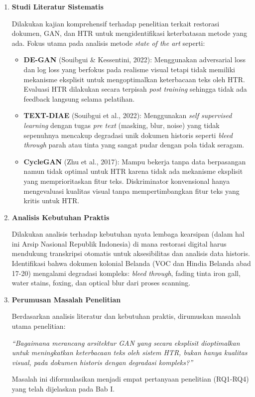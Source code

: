 \documentclass[12pt,a4paper]{article}
\begin{document}
\begin{enumerate}[label=\arabic*., leftmargin=*, nosep]
\item \textbf{Studi Literatur Sistematis}

Dilakukan kajian komprehensif terhadap penelitian terkait restorasi dokumen, GAN, dan HTR untuk mengidentifikasi keterbatasan metode yang ada. Fokus utama pada analisis metode \textit{state of the art} seperti:

\begin{itemize}[leftmargin=*, nosep]
\item \textbf{DE-GAN} (Souibgui \& Kessentini, 2022): Menggunakan adversarial loss dan log loss yang berfokus pada realisme visual tetapi tidak memiliki mekanisme eksplisit untuk mengoptimalkan keterbacaan teks oleh HTR. Evaluasi HTR dilakukan secara terpisah \textit{post training} sehingga tidak ada feedback langsung selama pelatihan.

\item \textbf{TEXT-DIAE} (Souibgui et al., 2022): Menggunakan \textit{self supervised learning} dengan tugas \textit{pre text} (masking, blur, noise) yang tidak sepenuhnya mencakup degradasi unik dokumen historis seperti \textit{bleed through} parah atau tinta yang sangat pudar dengan pola tidak seragam.

\item \textbf{CycleGAN} (Zhu et al., 2017): Mampu bekerja tanpa data berpasangan namun tidak optimal untuk HTR karena tidak ada mekanisme eksplisit yang memprioritaskan fitur teks. Diskriminator konvensional hanya mengevaluasi kualitas visual tanpa mempertimbangkan fitur teks yang kritis untuk HTR.
\end{itemize}

\vspace{1em} 

\item \textbf{Analisis Kebutuhan Praktis}

Dilakukan analisis terhadap kebutuhan nyata lembaga kearsipan (dalam hal ini Arsip Nasional Republik Indonesia) di mana restorasi digital harus mendukung transkripsi otomatis untuk aksesibilitas dan analisis data historis. Identifikasi bahwa dokumen kolonial Belanda (VOC dan Hindia Belanda abad 17-20) mengalami degradasi kompleks: \textit{bleed through}, fading tinta iron gall, water stains, foxing, dan optical blur dari proses scanning.
\vspace{1em}
\item \textbf{Perumusan Masalah Penelitian}

Berdasarkan analisis literatur dan kebutuhan praktis, dirumuskan masalah utama penelitian:

\textit{``Bagaimana merancang arsitektur GAN yang secara eksplisit dioptimalkan untuk meningkatkan keterbacaan teks oleh sistem HTR, bukan hanya kualitas visual, pada dokumen historis dengan degradasi kompleks?''}

Masalah ini diformulasikan menjadi empat pertanyaan penelitian (RQ1-RQ4) yang telah dijelaskan pada Bab I.
\end{enumerate}
\end{document}
